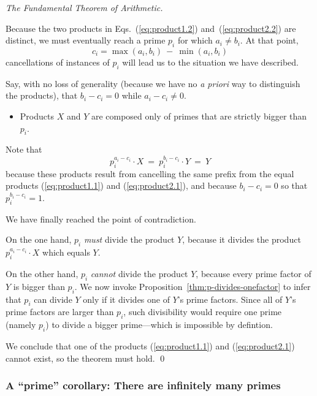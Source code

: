 \begin{proof}[The Fundamental Theorem of Arithmetic]
\begin{itemize}
\smallskip

Because the two products in Eqs.~(\ref{eq:product1.2}) and~(\ref{eq:product2.2}) are distinct, we must eventually reach a prime $p_i$ for which $a_i \neq b_i$.  At that point,
\[ c_i = \max(a_i, b_i) \ - \  \min(a_i, b_i) \]
cancellations of instances of $p_i$ will lead us to the situation we have described. 
\end{itemize}

Say, with no loss of generality (because we have no {\it a priori} way to distinguish the products), that $b_i -c_i = 0$ while $a_i -c_i \neq 0$.

\begin{itemize}
\item
Products $X$ and $Y$ are composed only of primes that are strictly bigger than $p_i$.
\end{itemize}
Note that 
\[ p_i^{a_i - c_i} \cdot X \ = \ p_i^{b_i -c_i} \cdot Y \ = \ Y \]
because these products result from cancelling the same prefix from the equal products (\ref{eq:product1.1}) and (\ref{eq:product2.1}), and because $b_i -c_i =0$ so that $p_i^{b_i -c_i}  = 1$.

\medskip

\noindent
We have finally reached the point of contradiction.

\smallskip

On the one hand, $p_i$ {\em must} divide the product $Y$, because it divides the product $p_i^{a_i -c_i} \cdot X$ which equals $Y$.


On the other hand, $p_i$ {\em cannot} divide the product $Y$, because every prime factor of $Y$ is bigger than $p_i$.   We now invoke Proposition~\ref{thm:p-divides-onefactor} to infer that $p_i$ can divide $Y$ only if it divides one of $Y$'s prime factors.  Since all of $Y$'s prime factors are larger than $p_i$, such divisibility would require one prime (namely $p_i$) to divide a bigger prime---which is impossible by defintion.

\smallskip

We conclude that one of the products (\ref{eq:product1.1}) and (\ref{eq:product2.1}) cannot exist, so the theorem must hold.  \qed
\end{proof}


\subsubsection{A ``prime'' corollary: There are infinitely many primes}
\label{sec:infinite-primes}

